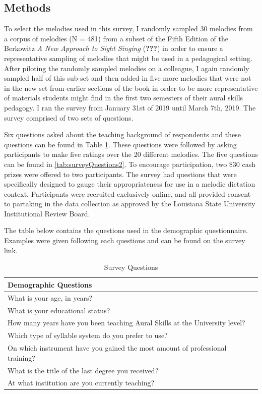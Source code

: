 \documentclass[english,man,floatsintext]{apa6}
\begin{document}
\hypertarget{methods}{%
\subsection{Methods}\label{methods}}

To select the melodies used in this survey, I randomly sampled 30 melodies from a corpus of melodies (N = 481) from a subset of the Fifth Edition of the Berkowitz \emph{A New Approach to Sight Singing} ({\textbf{???}}) in order to ensure a representative sampling of melodies that might be used in a pedagogical setting.
After piloting the randomly sampled melodies on a colleague, I again randomly sampled half of this sub-set and then added in five more melodies that were not in the new set from earlier sections of the book in order to be more representative of materials students might find in the first two semesters of their aural skills pedagogy.
I ran the survey from January 31st of 2019 until March 7th, 2019.
The survey comprised of two sets of questions.

Six questions asked about the teaching background of respondents and these questions can be found in Table \ref{tab:surveyQuestions1}.
These questions were followed by asking participants to make five ratings over the 20 different melodies.
The five questions can be found in \ref{tab:surveyQuestions2}.
To encourage participation, two \$30 cash prizes were offered to two participants.
The survey had questions that were specifically designed to gauge their appropriateness for use in a melodic dictation context.
Participants were recruited exclusively online, and all provided consent to partaking in the data collection as approved by the Louisiana State University Institutional Review Board.

The table below contains the questions used in the demographic questionnaire.
Examples were given following each questions and can be found on the survey link.

\begin{longtable}[t]{l}
\caption{\label{tab:surveyQuestions1}Survey Questions}\\
\toprule
Demographic Questions\\
\midrule
What is your age, in years?\\
What is your educational status?\\
How many years have you been teaching Aural Skills at the University level?\\
Which type of syllable system do you prefer to use?\\
On which instrument have you gained the most amount of professional training?\\
What is the title of the last degree you received?\\
At what institution are you currently teaching?\\
\bottomrule
\end{longtable}
\end{document}
